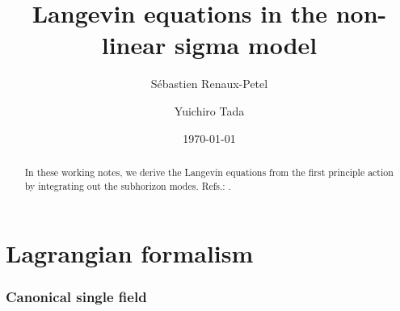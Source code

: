\documentclass[aps, prd
, preprint
, nofootinbib 
]{revtex4-1}
\begin{document}
\title{Langevin equations in the non-linear sigma model}
\date{\today}


\author{Sébastien Renaux-Petel}

\author{Yuichiro Tada}


\begin{abstract}
In these working notes, we derive the Langevin equations from the first principle action by integrating out the subhorizon modes.
Refs.: \cite{Morikawa:1989xz,Levasseur:2013ffa}.
\end{abstract}

\maketitle
\tableofcontents



\part{Lagrangian formalism}

\section{Canonical single field}
\end{document}
